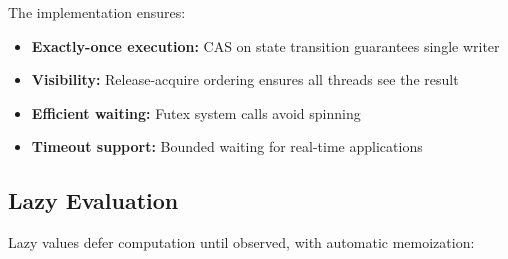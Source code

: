 \documentclass[11pt]{article}
\begin{document}
The implementation ensures:
\begin{itemize}
\item \textbf{Exactly-once execution:} CAS on state transition guarantees single writer
\item \textbf{Visibility:} Release-acquire ordering ensures all threads see the result
\item \textbf{Efficient waiting:} Futex system calls avoid spinning
\item \textbf{Timeout support:} Bounded waiting for real-time applications
\end{itemize}

\subsection{Lazy Evaluation}

Lazy values defer computation until observed, with automatic memoization:
\end{document}
